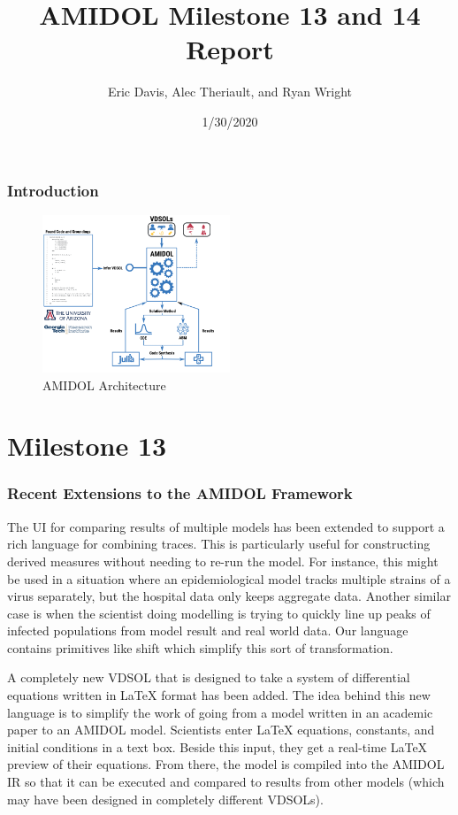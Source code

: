 \documentclass[12pt]{galois-whitepaper}
\author{Eric Davis, Alec Theriault, and Ryan Wright}
\title{AMIDOL Milestone 13 and 14 Report}
\date{1/30/2020}
\begin{document}
\maketitle

\vspace*{2cm}
\tableofcontents

\section{Introduction}

\begin{figure}
  \centering
  \includegraphics[width=0.5\textwidth]{figs/AMIDOL-architecture.png}
  \caption{AMIDOL Architecture}
  \label{Fig:Arch}
\end{figure}

\part{Milestone 13}

\section{Recent Extensions to the AMIDOL Framework}

The UI for comparing results of multiple models has been extended to support a rich language for combining traces. This is particularly useful for constructing derived measures without needing to re-run the model. For instance, this might be used in a situation where an epidemiological model tracks multiple strains of a virus separately, but the hospital data only keeps aggregate data. Another similar case is when the scientist doing modelling is trying to quickly line up peaks of infected populations from model result and real world data. Our language contains primitives like shift which simplify this sort of transformation.

A completely new VDSOL that is designed to take a system of
differential equations written in LaTeX format has been added. The
idea behind this new language is to simplify the work of going from a
model written in an academic paper to an AMIDOL model. Scientists
enter LaTeX equations, constants, and initial conditions in a text
box. Beside this input, they get a real-time LaTeX preview of their
equations. From there, the model is compiled into the AMIDOL IR so
that it can be executed and compared to results from other models
(which may have been designed in completely different VDSOLs).
\end{document}
